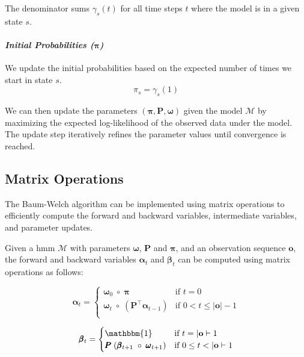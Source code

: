 The denominator sums $\gamma_s(t)$ for all time steps $t$ where the model is in a given state $s$.


\paragraph*{\textit{Initial Probabilities ($\pmb{\pi}$)}}

We update the initial probabilities based on the expected number of times we start in state $s$.
\begin{equation}
    \pi_s = \gamma_s(1)
    \label{eq:initial-probabilities}
\end{equation}

We can then update the parameters $(\pmb{\pi}, \pmb{P}, \pmb{\omega})$ given the model $\mathcal{M}$ by maximizing the expected log-likelihood of the observed data under the model.
The update step iteratively refines the parameter values until convergence is reached.

\subsection{Matrix Operations}\label{subsec:matrix-operations}
The Baum-Welch algorithm can be implemented using matrix operations to efficiently compute the forward and backward variables, intermediate variables, and parameter updates.

Given a \gls{hmm} $\mathcal{M}$ with parameters $\pmb{\omega}$, $\pmb{P}$ and $\pmb{\pi}$, and an observation sequence $\mathbf{o}$, the forward and backward variables $\pmb{\alpha}_t$ and $\pmb{\beta}_t$ can be computed using matrix operations as follows:

\begin{equation}
    \label{eq:alpha}
    \pmb{\alpha}_t =
    \begin{cases}
        \pmb{\omega}_0 \; \circ \; \pmb{\pi}   & \text{if } t = 0    \\
        \pmb{\omega}_t \; \circ \; \left( \pmb{P}^\top \pmb{\alpha}_{t - 1} \right)   & \text{if } 0 < t \leq |\mathbf{o}|-1 \\
    \end{cases}
\end{equation}


\begin{equation}
    \label{eq:beta}
    \pmb{\beta}_t =
    \begin{cases}
        \mathbbm{1} & \text{if } t = |\mathbf{o}|-1        \\
        \pmb{P} \; (\pmb{\beta}_{t + 1} \; \circ \; \pmb{\omega}_{t + 1}) & \text{if } 0 \leq t < |\mathbf{o}|-1 \\
    \end{cases}
\end{equation}

